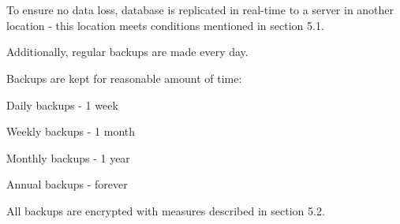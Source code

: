\section{}
\begin{packed_enum}
	\item To ensure no data loss, database is replicated in real-time to a server in another location - this location meets conditions mentioned in section 5.1.
	\item Additionally, regular backups are made every day.
	\item Backups are kept for reasonable amount of time:
        \begin{packed_enum}
			\item Daily backups - 1 week
			\item Weekly backups - 1 month
			\item Monthly backups - 1 year
			\item Annual backups - forever
		\end{packed_enum}
	\item All backups are encrypted with measures described in section 5.2.
\end{packed_enum}